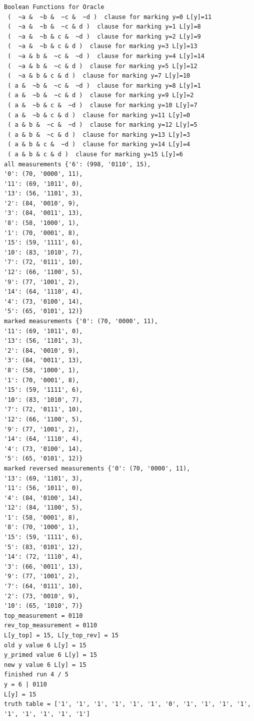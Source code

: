 \documentclass[11pt]{article}
\begin{document}
\begin{verbatim}
Boolean Functions for Oracle
 (  ~a &  ~b &  ~c &  ~d )  clause for marking y=0 L[y]=11
 (  ~a &  ~b &  ~c & d )  clause for marking y=1 L[y]=8
 (  ~a &  ~b & c &  ~d )  clause for marking y=2 L[y]=9
 (  ~a &  ~b & c & d )  clause for marking y=3 L[y]=13
 (  ~a & b &  ~c &  ~d )  clause for marking y=4 L[y]=14
 (  ~a & b &  ~c & d )  clause for marking y=5 L[y]=12
 (  ~a & b & c & d )  clause for marking y=7 L[y]=10
 ( a &  ~b &  ~c &  ~d )  clause for marking y=8 L[y]=1
 ( a &  ~b &  ~c & d )  clause for marking y=9 L[y]=2
 ( a &  ~b & c &  ~d )  clause for marking y=10 L[y]=7
 ( a &  ~b & c & d )  clause for marking y=11 L[y]=0
 ( a & b &  ~c &  ~d )  clause for marking y=12 L[y]=5
 ( a & b &  ~c & d )  clause for marking y=13 L[y]=3
 ( a & b & c &  ~d )  clause for marking y=14 L[y]=4
 ( a & b & c & d )  clause for marking y=15 L[y]=6
all measurements {'6': (998, '0110', 15),
'0': (70, '0000', 11),
'11': (69, '1011', 0),
'13': (56, '1101', 3),
'2': (84, '0010', 9),
'3': (84, '0011', 13),
'8': (58, '1000', 1),
'1': (70, '0001', 8),
'15': (59, '1111', 6),
'10': (83, '1010', 7),
'7': (72, '0111', 10),
'12': (66, '1100', 5),
'9': (77, '1001', 2),
'14': (64, '1110', 4),
'4': (73, '0100', 14),
'5': (65, '0101', 12)}
marked measurements {'0': (70, '0000', 11),
'11': (69, '1011', 0),
'13': (56, '1101', 3),
'2': (84, '0010', 9),
'3': (84, '0011', 13),
'8': (58, '1000', 1),
'1': (70, '0001', 8),
'15': (59, '1111', 6),
'10': (83, '1010', 7),
'7': (72, '0111', 10),
'12': (66, '1100', 5),
'9': (77, '1001', 2),
'14': (64, '1110', 4),
'4': (73, '0100', 14),
'5': (65, '0101', 12)}
marked reversed measurements {'0': (70, '0000', 11),
'13': (69, '1101', 3),
'11': (56, '1011', 0),
'4': (84, '0100', 14),
'12': (84, '1100', 5),
'1': (58, '0001', 8),
'8': (70, '1000', 1),
'15': (59, '1111', 6),
'5': (83, '0101', 12),
'14': (72, '1110', 4),
'3': (66, '0011', 13),
'9': (77, '1001', 2),
'7': (64, '0111', 10),
'2': (73, '0010', 9),
'10': (65, '1010', 7)}
top_measurement = 0110
rev_top_measurement = 0110
L[y_top] = 15, L[y_top_rev] = 15
old y value 6 L[y] = 15
y_primed value 6 L[y] = 15
new y value 6 L[y] = 15
finished run 4 / 5
y = 6 | 0110
L[y] = 15
truth table = ['1', '1', '1', '1', '1', '1', '0', '1', '1', '1', '1', '1', '1', '1', '1', '1']


\end{verbatim}
\end{document}

